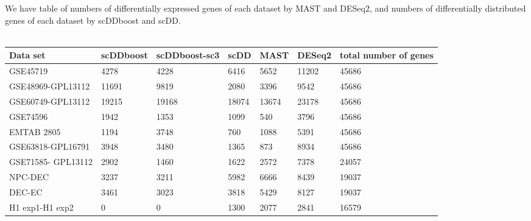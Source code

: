 \documentclass[11pt]{amsart}
\begin{document}
We have table of numbers of differentially expressed genes of each dataset by MAST and DESeq2, and numbers of differentially distributed genes of each dataset by scDDboost and scDD.\\
\\
\begin{tabular}{ |p{2cm}|p{2cm}|p{2cm}|p{2cm}|p{2cm}|p{2cm}|p{2cm}|}
\hline
Data set & scDDboost & scDDboost-sc3 & scDD & MAST & DESeq2 & total number of genes\\
\hline
\hline
GSE45719 & 4278 & 4228 & 6416 &5652 & 11202 & 45686\\
\hline
GSE48969-GPL13112 & 11691 & 9819 & 2080 & 3396 & 9542 & 45686\\
\hline
GSE60749-GPL13112 & 19215 & 19168 &  18074 & 13674 & 23178 & 45686\\
\hline
GSE74596 & 1942 & 1353 & 1099 & 540 & 3796 & 45686\\
\hline
EMTAB 2805 & 1194 & 3748 & 760 & 1088 & 5391 & 45686\\
\hline
GSE63818-GPL16791 & 3948 & 3480 & 1365 & 873 & 8934 & 45686\\
\hline
GSE71585- GPL13112 & 2902 & 1460 & 1622 & 2572 & 7378 & 24057 \\
\hline
NPC-DEC & 3237 & 3211 & 5982 & 6666 & 8439 & 19037\\
\hline
DEC-EC & 3461 & 3023 & 3818 & 5429 & 8127 & 19037\\
\hline
H1 exp1-H1 exp2 &  0 & 0 & 1300 & 2077 & 2841 & 16579\\
\hline
\end{tabular}\\
\end{document}
